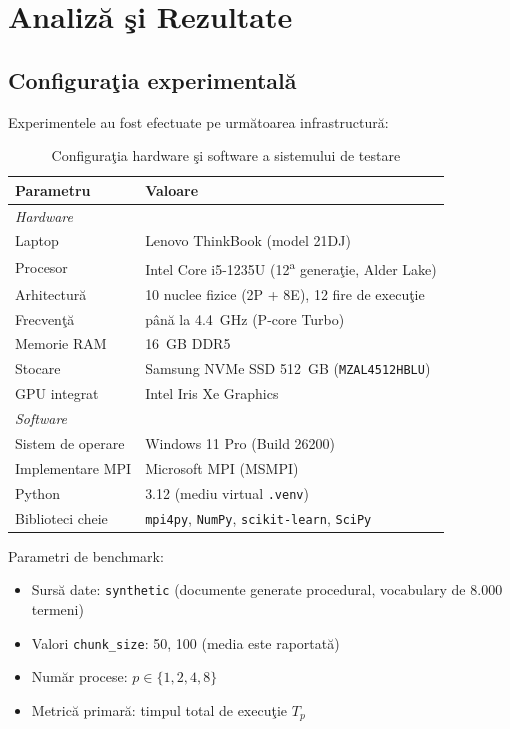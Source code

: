 \documentclass[a4paper,12pt]{report}
\begin{document}
\chapter{Analiz\u{a} \c{s}i Rezultate}

\section{Configura\c{t}ia experimental\u{a}}

Experimentele au fost efectuate pe urm\u{a}toarea infrastructur\u{a}:

\begin{table}[H]
\centering
\caption{Configura\c{t}ia hardware \c{s}i software a sistemului de testare}
\begin{tabular}{ll}
\toprule
\textbf{Parametru} & \textbf{Valoare} \\
\midrule
\multicolumn{2}{l}{\textit{Hardware}} \\
\midrule
Laptop              & Lenovo ThinkBook (model 21DJ) \\
Procesor            & Intel Core i5-1235U (12\textsuperscript{a} genera\c{t}ie, Alder Lake) \\
Arhitectur\u{a}    & 10 nuclee fizice (2P + 8E), 12 fire de execu\c{t}ie \\
Frecven\c{t}\u{a}  & p\^{a}n\u{a} la 4.4~GHz (P-core Turbo) \\
Memorie RAM         & 16~GB DDR5 \\
Stocare             & Samsung NVMe SSD 512~GB (\texttt{MZAL4512HBLU}) \\
GPU integrat        & Intel Iris Xe Graphics \\
\midrule
\multicolumn{2}{l}{\textit{Software}} \\
\midrule
Sistem de operare   & Windows 11 Pro (Build 26200) \\
Implementare MPI    & Microsoft MPI (MSMPI) \\
Python              & 3.12 (mediu virtual \texttt{.venv}) \\
Biblioteci cheie    & \texttt{mpi4py}, \texttt{NumPy}, \texttt{scikit-learn}, \texttt{SciPy} \\
\bottomrule
\end{tabular}
\label{tab:config}
\end{table}

\noindent Parametri de benchmark:
\begin{itemize}
  \item Surs\u{a} date: \texttt{synthetic} (documente generate procedural, vocabulary de 8.000 termeni)
  \item Valori \texttt{chunk\_size}: 50, 100 (media este raportat\u{a})
  \item Num\u{a}r procese: $p \in \{1, 2, 4, 8\}$
  \item Metric\u{a} primar\u{a}: timpul total de execu\c{t}ie $T_p$
\end{itemize}
\end{document}

